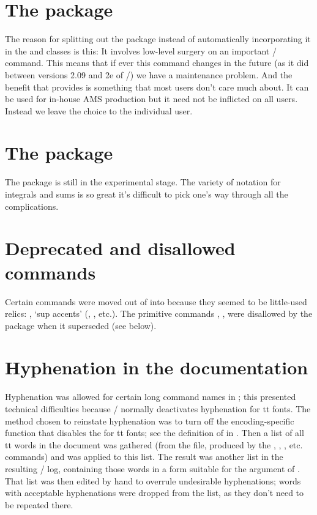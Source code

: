 \documentclass{amsdtx}
\begin{document}
\section{The  package}

The reason for splitting out the  package instead of
automatically incorporating it in the  and 
classes is this: It involves low-level surgery on an important \latex/
command. This means that if ever this command changes in the future (as
it did between versions 2.09 and 2e of \latex/) we have a maintenance
problem. And the benefit that  provides is something that
most users don't care much about. It can be used for in-house AMS
production but it need not be inflicted on all users. Instead we leave
the choice to the individual user.

\section{The  package}

The  package is still in the experimental stage. The
variety of notation for integrals and sums is so great it's difficult to
pick one's way through all the complications.

\section{Deprecated and disallowed commands}

Certain commands were moved out of  into 
because they seemed to be little-used relics:
, `sup accents' (, , etc.). The
primitive commands , ,  were disallowed by
the  package when it superseded  (see below).

\section{Hyphenation in the documentation}

Hyphenation was allowed for certain long command names in
; this presented technical difficulties because \latex/
normally deactivates hyphenation for tt fonts. The method chosen to
reinstate hyphenation was to turn off the encoding-specific function
 that disables the  for tt fonts; see the
definition of  in . Then a list of all
tt words in the document was gathered (from the  file, produced
by the , , , etc. commands) and 
was applied to this list. The result was another list in the resulting
\tex/ log, containing those words in a form suitable for the argument of
. That list was then edited by hand to overrule
undesirable hyphenations; words with acceptable hyphenations were
dropped from the list, as they don't need to be repeated there.
\end{document}
